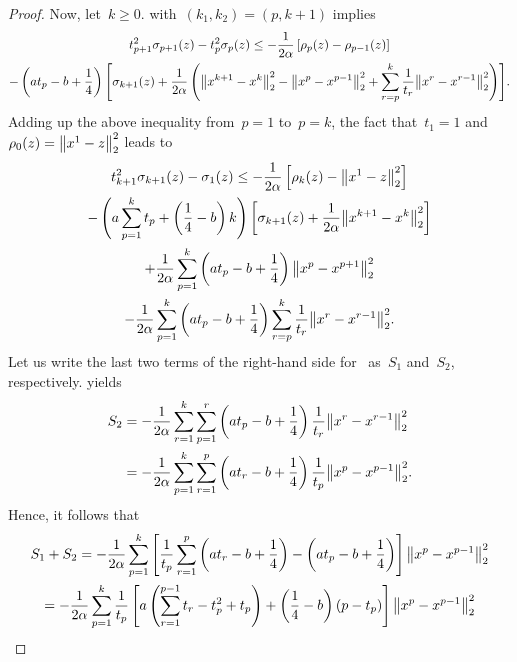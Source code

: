 \documentclass[../main]{subfiles}
\begin{document}
\begin{proof}
    Now, let~$k \ge 0$.
     with~$(k_1, k_2) = (p, k + 1)$ implies
    \begin{multline}
        t_{p + 1}^2 \sigma_{p + 1}(z) - t_p^2 \sigma_p(z) \le - \frac{1}{2 \alpha} \left[ \rho_p(z) - \rho_{p - 1}(z) \right] \\
        - \left( a t_p - b + \frac{1}{4} \right) \Biggl[ \sigma_{k + 1}(z) + \frac{1}{2 \alpha} \left( \norm*{x^{k + 1} - x^k}_2^2 - \norm*{x^p - x^{p - 1}}_2^2 + \sum_{r = p}^k \frac{1}{t_r} \norm*{x^r - x^{r - 1}}_2^2 \right) \Biggr]
        .\end{multline}
    Adding up the above inequality from~$p = 1$ to~$p = k$, the fact that~$t_1 = 1$ and~$\rho_0(z) = \norm*{x^1 - z}_2^2$ leads to
    \begin{multline} \label{eq:key relation tmp}
        t_{k + 1}^2 \sigma_{k + 1}(z) - \sigma_1(z) \le - \frac{1}{2 \alpha} \left[ \rho_{k}(z) - \norm*{x^1 - z}_2^2 \right] \\
        - \left( a \sum_{p = 1}^{k} t_p + \left( \frac{1}{4} - b \right) k \right) \left[ \sigma_{k + 1}(z) + \frac{1}{2 \alpha} \norm*{x^{k + 1} - x^k}_2^2 \right] \\
        + \frac{1}{2 \alpha} \sum_{p = 1}^{k} \left( a t_p - b + \frac{1}{4} \right) \norm*{x^p - x^{p + 1}}_2^2 \\
        - \frac{1}{2 \alpha} \sum_{p = 1}^{k} \left( a t_p - b + \frac{1}{4} \right) \sum_{r = p}^{k} \frac{1}{t_r} \norm*{x^r - x^{r - 1}}_2^2
        .\end{multline}
    Let us write the last two terms of the right-hand side for~ as~$S_1$ and~$S_2$, respectively.
     yields
    \begin{align}
        S_2 & = - \frac{1}{2 \alpha} \sum_{r = 1}^{k} \sum_{p = 1}^{r} \left( a t_p - b + \frac{1}{4} \right) \frac{1}{t_r} \norm*{x^r - x^{r - 1}}_2^2 \\
            & = - \frac{1}{2 \alpha} \sum_{p = 1}^{k} \sum_{r = 1}^{p} \left( a t_r - b + \frac{1}{4} \right) \frac{1}{t_p} \norm*{x^p - x^{p - 1}}_2^2
        .\end{align}
    Hence, it follows that
    \begin{multline} \label{eq:s_1 + s_2}
        S_1 + S_2 = - \frac{1}{2 \alpha} \sum_{p = 1}^{k} \left[ \frac{1}{t_p} \sum_{r = 1}^{p} \left( a t_r - b + \frac{1}{4} \right) - \left( a t_p - b + \frac{1}{4} \right) \right] \norm*{x^p - x^{p - 1}}_2^2 \\
        = - \frac{1}{2 \alpha} \sum_{p = 1}^{k} \frac{1}{t_p} \left[ a \left( \sum_{r = 1}^{p - 1} t_r - t_p^2 + t_p \right) + \left( \frac{1}{4} - b \right) (p - t_p) \right] \norm*{x^p - x^{p - 1}}_2^2

\end{multline}
\end{proof}
\end{document}
